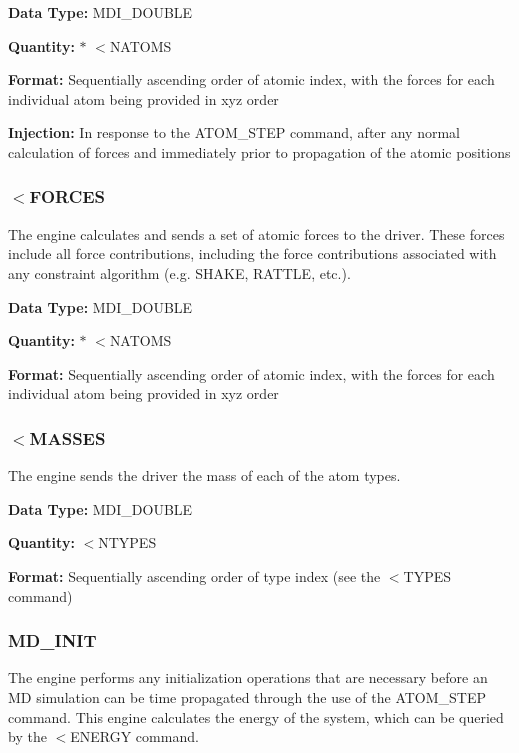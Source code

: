 \begin{DoxyParagraph}{}
{\bfseries  Data Type\-: } M\-D\-I\-\_\-\-D\-O\-U\-B\-L\-E \par
 {\bfseries  Quantity\-: } { $\ast$ $<$N\-A\-T\-O\-M\-S } \par
 {\bfseries  Format\-: } Sequentially ascending order of atomic index, with the forces for each individual atom being provided in xyz order \par
 {\bfseries  Injection\-: } In response to the {\ttfamily A\-T\-O\-M\-\_\-\-S\-T\-E\-P} command, after any normal calculation of forces and immediately prior to propagation of the atomic positions
\end{DoxyParagraph}
\hypertarget{index_recv_forces}{}\subsubsection{$<$\-F\-O\-R\-C\-E\-S}\label{index_recv_forces}
The engine calculates and sends a set of atomic forces to the driver. These forces include all force contributions, including the force contributions associated with any constraint algorithm (e.\-g. S\-H\-A\-K\-E, R\-A\-T\-T\-L\-E, etc.).

\begin{DoxyParagraph}{}
{\bfseries  Data Type\-: } M\-D\-I\-\_\-\-D\-O\-U\-B\-L\-E \par
 {\bfseries  Quantity\-: } { $\ast$ $<$N\-A\-T\-O\-M\-S } \par
 {\bfseries  Format\-: } Sequentially ascending order of atomic index, with the forces for each individual atom being provided in xyz order
\end{DoxyParagraph}
\hypertarget{index_recv_masses}{}\subsubsection{$<$\-M\-A\-S\-S\-E\-S}\label{index_recv_masses}
The engine sends the driver the mass of each of the atom types.

\begin{DoxyParagraph}{}
{\bfseries  Data Type\-: } M\-D\-I\-\_\-\-D\-O\-U\-B\-L\-E \par
 {\bfseries  Quantity\-: } {\ttfamily  $<$N\-T\-Y\-P\-E\-S } \par
 {\bfseries  Format\-: } Sequentially ascending order of type index (see the {\ttfamily $<$T\-Y\-P\-E\-S} command)
\end{DoxyParagraph}
\hypertarget{index_md_init}{}\subsubsection{M\-D\-\_\-\-I\-N\-I\-T}\label{index_md_init}
The engine performs any initialization operations that are necessary before an M\-D simulation can be time propagated through the use of the {\ttfamily A\-T\-O\-M\-\_\-\-S\-T\-E\-P} command. This engine calculates the energy of the system, which can be queried by the {\ttfamily $<$E\-N\-E\-R\-G\-Y} command.

